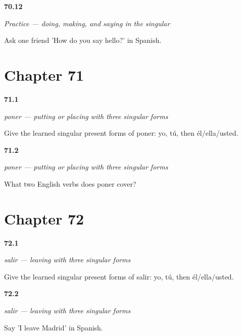 \noindent\begin{minipage}[t]{\linewidth}
\raggedright
\hypertarget{review-ES-C12-practice-how-say-hello}{\textbf{70.12}} \emph{Practice — doing, making, and saying in the singular}\par
\small Ask one friend 'How do you say hello?' in Spanish.
\end{minipage}\par\medskip

\section*{Chapter 71}

\noindent\begin{minipage}[t]{\linewidth}
\raggedright
\hypertarget{review-ES-C13-poner-singular-forms}{\textbf{71.1}} \emph{poner — putting or placing with three singular forms}\par
\small Give the learned singular present forms of poner: yo, tú, then él/ella/usted.
\end{minipage}\par\medskip

\noindent\begin{minipage}[t]{\linewidth}
\raggedright
\hypertarget{review-ES-C13-poner-meaning}{\textbf{71.2}} \emph{poner — putting or placing with three singular forms}\par
\small What two English verbs does poner cover?
\end{minipage}\par\medskip

\section*{Chapter 72}

\noindent\begin{minipage}[t]{\linewidth}
\raggedright
\hypertarget{review-ES-C13-salir-singular-forms}{\textbf{72.1}} \emph{salir — leaving with three singular forms}\par
\small Give the learned singular present forms of salir: yo, tú, then él/ella/usted.
\end{minipage}\par\medskip

\noindent\begin{minipage}[t]{\linewidth}
\raggedright
\hypertarget{review-ES-C13-salir-leave-madrid}{\textbf{72.2}} \emph{salir — leaving with three singular forms}\par
\small Say 'I leave Madrid' in Spanish.
\end{minipage}\par\medskip

